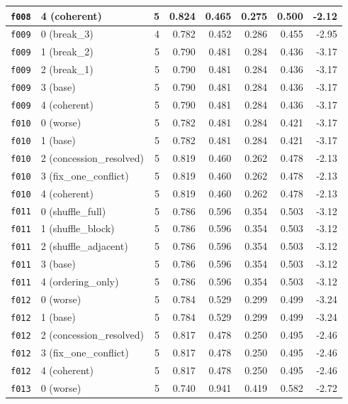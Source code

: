 \documentclass[11pt]{article}
\begin{document}
\begin{table}[htbp]
\begin{tabular}{llrrrrrr}
\texttt{f008} & 4 (coherent) & 5 & 0.824 & 0.465 & 0.275 & 0.500 & -2.12 \\
\midrule
\texttt{f009} & 0 (break\_3) & 4 & 0.782 & 0.452 & 0.286 & 0.455 & -2.95 \\
\texttt{f009} & 1 (break\_2) & 5 & 0.790 & 0.481 & 0.284 & 0.436 & -3.17 \\
\texttt{f009} & 2 (break\_1) & 5 & 0.790 & 0.481 & 0.284 & 0.436 & -3.17 \\
\texttt{f009} & 3 (base) & 5 & 0.790 & 0.481 & 0.284 & 0.436 & -3.17 \\
\texttt{f009} & 4 (coherent) & 5 & 0.790 & 0.481 & 0.284 & 0.436 & -3.17 \\
\midrule
\texttt{f010} & 0 (worse) & 5 & 0.782 & 0.481 & 0.284 & 0.421 & -3.17 \\
\texttt{f010} & 1 (base) & 5 & 0.782 & 0.481 & 0.284 & 0.421 & -3.17 \\
\texttt{f010} & 2 (concession\_resolved) & 5 & 0.819 & 0.460 & 0.262 & 0.478 & -2.13 \\
\texttt{f010} & 3 (fix\_one\_conflict) & 5 & 0.819 & 0.460 & 0.262 & 0.478 & -2.13 \\
\texttt{f010} & 4 (coherent) & 5 & 0.819 & 0.460 & 0.262 & 0.478 & -2.13 \\
\midrule
\texttt{f011} & 0 (shuffle\_full) & 5 & 0.786 & 0.596 & 0.354 & 0.503 & -3.12 \\
\texttt{f011} & 1 (shuffle\_block) & 5 & 0.786 & 0.596 & 0.354 & 0.503 & -3.12 \\
\texttt{f011} & 2 (shuffle\_adjacent) & 5 & 0.786 & 0.596 & 0.354 & 0.503 & -3.12 \\
\texttt{f011} & 3 (base) & 5 & 0.786 & 0.596 & 0.354 & 0.503 & -3.12 \\
\texttt{f011} & 4 (ordering\_only) & 5 & 0.786 & 0.596 & 0.354 & 0.503 & -3.12 \\
\midrule
\texttt{f012} & 0 (worse) & 5 & 0.784 & 0.529 & 0.299 & 0.499 & -3.24 \\
\texttt{f012} & 1 (base) & 5 & 0.784 & 0.529 & 0.299 & 0.499 & -3.24 \\
\texttt{f012} & 2 (concession\_resolved) & 5 & 0.817 & 0.478 & 0.250 & 0.495 & -2.46 \\
\texttt{f012} & 3 (fix\_one\_conflict) & 5 & 0.817 & 0.478 & 0.250 & 0.495 & -2.46 \\
\texttt{f012} & 4 (coherent) & 5 & 0.817 & 0.478 & 0.250 & 0.495 & -2.46 \\
\midrule
\texttt{f013} & 0 (worse) & 5 & 0.740 & 0.941 & 0.419 & 0.582 & -2.72 \\

\end{tabular}
\end{table}
\end{document}
